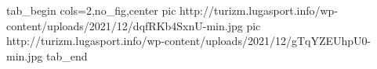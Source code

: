  
 
 
 
 

\ifcmt
  tab_begin cols=2,no_fig,center
     pic http://turizm.lugasport.info/wp-content/uploads/2021/12/dqfRKb4SxnU-min.jpg
		 pic http://turizm.lugasport.info/wp-content/uploads/2021/12/gTqYZEUhpU0-min.jpg
  tab_end
\fi
